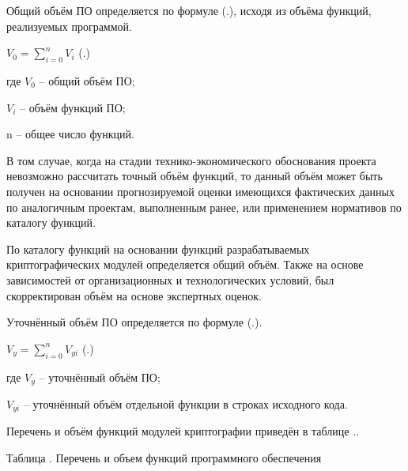 \subtitlespace

{\gostFont
	
	\par \redline Общий объём ПО определяется по формуле (\thechaptercntr .\theformulacntr), исходя из объёма функций, реализуемых программой. 
	
	\formulaspace \par \redline 
	$V_0=\sum_{i=0}^{n}V_i$ 
	\hfill (\thechaptercntr .\theformulacntr) \redline
	\formulaspace \addtocounter{formulacntr}{1}

	\par \redline где $V_0$ {--} общий объём ПО;
	\par \redline \wherespace $V_i$ {--} объём функций ПО;
	\par \redline \wherespace n {--} общее число функций.
	
	\par \redline В том случае, когда на стадии технико-экономического обоснования проекта невозможно рассчитать точный объём функций, то данный объём может быть получен на основании прогнозируемой оценки имеющихся фактических данных по аналогичным проектам, выполненным ранее, или применением нормативов по каталогу функций.
	
	\par \redline По каталогу функций на основании функций разрабатываемых криптографических модулей определяется общий объём. Также на основе зависимостей от организационных и технологических условий, был скорректирован объём на основе экспертных оценок.
	
	\par \redline Уточнённый объём ПО определяется по формуле (\thechaptercntr .\theformulacntr).
	
	\formulaspace \par \redline 
	$V_y=\sum_{i=0}^{n}V_{yi}$ 
	\hfill (\thechaptercntr .\theformulacntr) \redline
	\formulaspace \addtocounter{formulacntr}{1}
	
	\par \redline где $V_y$ {--} уточнённый объём ПО;
	\par \redline \wherespace $V_{yi}$ {--} уточнённый объём отдельной функции в строках исходного кода.
	
	\par \redline Перечень и объём функций модулей криптографии приведён в таблице \thechaptercntr .\thetablecntr .

	\topTablespace
	{\begin{Center} 
		\par Таблица \thechaptercntr .\thetablecntr \spc {--} Перечень и объем функций программного обеспечения 


\end{Center}}}
